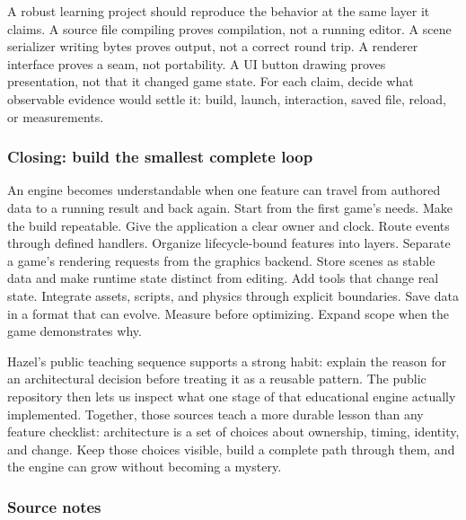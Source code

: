 A robust learning project should reproduce the behavior at the same layer it claims. A source file compiling proves compilation, not a running editor. A scene serializer writing bytes proves output, not a correct round trip. A renderer interface proves a seam, not portability. A UI button drawing proves presentation, not that it changed game state. For each claim, decide what observable evidence would settle it: build, launch, interaction, saved file, reload, or measurements.

\subsubsection{Closing: build the smallest complete loop}\label{closing-build-the-smallest-complete-loop}

An engine becomes understandable when one feature can travel from authored data to a running result and back again. Start from the first game's needs. Make the build repeatable. Give the application a clear owner and clock. Route events through defined handlers. Organize lifecycle-bound features into layers. Separate a game's rendering requests from the graphics backend. Store scenes as stable data and make runtime state distinct from editing. Add tools that change real state. Integrate assets, scripts, and physics through explicit boundaries. Save data in a format that can evolve. Measure before optimizing. Expand scope when the game demonstrates why.

Hazel's public teaching sequence supports a strong habit: explain the reason for an architectural decision before treating it as a reusable pattern. The public repository then lets us inspect what one stage of that educational engine actually implemented. Together, those sources teach a more durable lesson than any feature checklist: architecture is a set of choices about ownership, timing, identity, and change. Keep those choices visible, build a complete path through them, and the engine can grow without becoming a mystery.

\subsubsection{Source notes}\label{source-notes}

